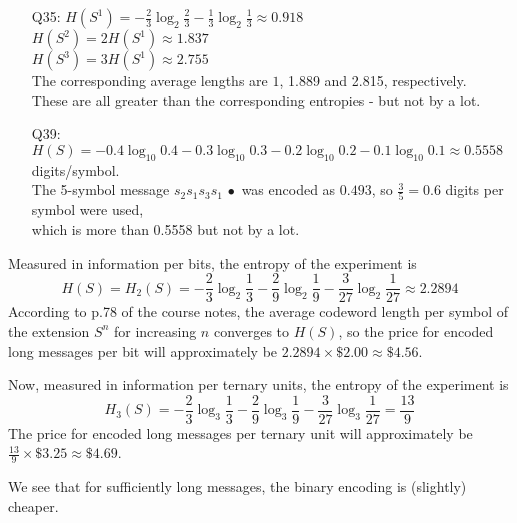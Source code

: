 \documentclass[11pt]{article}
\begin{document}
\begin{itemize}
  \item[{Q35:}] $H(S^1) = -\frac{2}{3}\log_2\frac{2}{3} -\frac{1}{3}\log_2\frac{1}{3} \approx 0.918$
        \\$H(S^2) = 2H(S^1) \approx 1.837$
        \\$H(S^3) = 3H(S^1) \approx 2.755$
        \\The corresponding average lengths are $1$, 1.889 and 2.815, respectively.
        \\These are all greater than the corresponding entropies - but not by a lot.
  \item[{Q39:}] $H(S) = -0.4\log_{10}0.4 -0.3\log_{10}0.3 - 0.2\log_{10}0.2 -0.1\log_{10}0.1 \approx 0.5558$ digits/symbol.
        \\The 5-symbol message $s_2s_1s_3s_1\,\bullet$ was encoded as $0.493$, so $\frac{3}{5} = 0.6$ digits per symbol were used,
        \\which is more than 0.5558 but not by a lot.
\end{itemize}

\bigskip{}
Measured in information per bits,
the entropy of the experiment is
\[
  H(S) = H_2(S)
       = -\frac{2}{3}\log_2\frac{1}{3} - \frac{2}{9}\log_2\frac{1}{9} - \frac{3}{27}\log_2\frac{1}{27}
       \approx 2.2894
\]
According to p.78 of the course notes, the average codeword length per symbol of the extension $S^n$ for increasing $n$
converges to $H(S)$, so the price for encoded long messages per bit will approximately be $2.2894\times\$2.00\approx \$4.56$.

Now,
measured in information per ternary units,
the entropy of the experiment is
\[
    H_3(S)
  = -\frac{2}{3}\log_3\frac{1}{3} - \frac{2}{9}\log_3\frac{1}{9} - \frac{3}{27}\log_3\frac{1}{27}
  =  \frac{13}{9}
\]
The price for encoded long messages per ternary unit will approximately be $\frac{13}{9}\times\$3.25\approx \$4.69$.

We see that for sufficiently long messages, the binary encoding is (slightly) cheaper.
\end{document}

